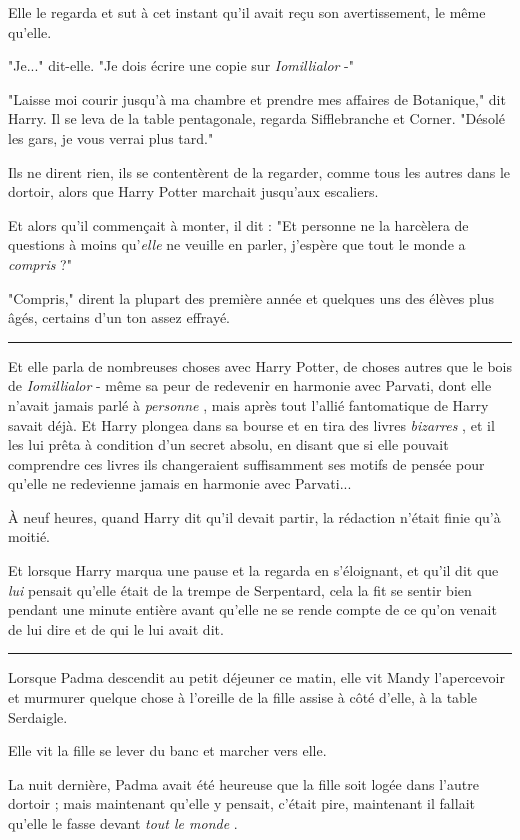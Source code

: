 Elle le regarda et sut à cet instant qu'il avait reçu son avertissement, le même qu'elle.

"Je..." dit-elle. "Je dois écrire une copie sur \emph{Iomillialor } -"

"Laisse moi courir jusqu'à ma chambre et prendre mes affaires de Botanique," dit Harry. Il se leva de la table pentagonale, regarda Sifflebranche et Corner. "Désolé les gars, je vous verrai plus tard."

Ils ne dirent rien, ils se contentèrent de la regarder, comme tous les autres dans le dortoir, alors que Harry Potter marchait jusqu'aux escaliers.

Et alors qu'il commençait à monter, il dit : "Et personne ne la harcèlera de questions à moins qu'\emph{elle}  ne veuille en parler, j'espère que tout le monde a \emph{compris}  ?"

"Compris," dirent la plupart des première année et quelques uns des élèves plus âgés, certains d'un ton assez effrayé.
\par\noindent\rule{\textwidth}{0.4pt}
Et elle parla de nombreuses choses avec Harry Potter, de choses autres que le bois de \emph{Iomillialor}  - même sa peur de redevenir en harmonie avec Parvati, dont elle n'avait jamais parlé à \emph{personne} , mais après tout l'allié fantomatique de Harry savait déjà. Et Harry plongea dans sa bourse et en tira des livres \emph{bizarres} , et il les lui prêta à condition d'un secret absolu, en disant que si elle pouvait comprendre ces livres ils changeraient suffisamment ses motifs de pensée pour qu'elle ne redevienne jamais en harmonie avec Parvati...

À neuf heures, quand Harry dit qu'il devait partir, la rédaction n'était finie qu'à moitié.

Et lorsque Harry marqua une pause et la regarda en s'éloignant, et qu'il dit que \emph{lui}  pensait qu'elle était de la trempe de Serpentard, cela la fit se sentir bien pendant une minute entière avant qu'elle ne se rende compte de ce qu'on venait de lui dire et de qui le lui avait dit.
\par\noindent\rule{\textwidth}{0.4pt}
Lorsque Padma descendit au petit déjeuner ce matin, elle vit Mandy l'apercevoir et murmurer quelque chose à l'oreille de la fille assise à côté d'elle, à la table Serdaigle.

Elle vit la fille se lever du banc et marcher vers elle.

La nuit dernière, Padma avait été heureuse que la fille soit logée dans l'autre dortoir ; mais maintenant qu'elle y pensait, c'était pire, maintenant il fallait qu'elle le fasse devant \emph{tout le monde} .

